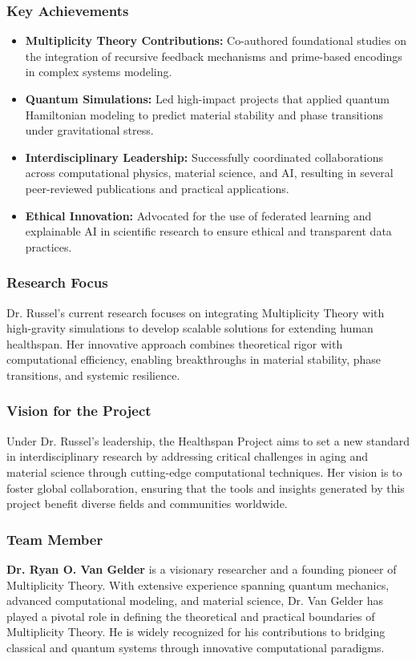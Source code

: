 \documentclass{article}
\theoremstyle{plain}
\begin{document}
\subsubsection*{Key Achievements}
\begin{itemize}
    \item \textbf{Multiplicity Theory Contributions:} Co-authored foundational studies on the integration of recursive feedback mechanisms and prime-based encodings in complex systems modeling.
    \item \textbf{Quantum Simulations:} Led high-impact projects that applied quantum Hamiltonian modeling to predict material stability and phase transitions under gravitational stress.
    \item \textbf{Interdisciplinary Leadership:} Successfully coordinated collaborations across computational physics, material science, and AI, resulting in several peer-reviewed publications and practical applications.
    \item \textbf{Ethical Innovation:} Advocated for the use of federated learning and explainable AI in scientific research to ensure ethical and transparent data practices.
\end{itemize}

\subsubsection*{Research Focus}
Dr. Russel’s current research focuses on integrating Multiplicity Theory with high-gravity simulations to develop scalable solutions for extending human healthspan. Her innovative approach combines theoretical rigor with computational efficiency, enabling breakthroughs in material stability, phase transitions, and systemic resilience.

\subsubsection*{Vision for the Project}
Under Dr. Russel’s leadership, the Healthspan Project aims to set a new standard in interdisciplinary research by addressing critical challenges in aging and material science through cutting-edge computational techniques. Her vision is to foster global collaboration, ensuring that the tools and insights generated by this project benefit diverse fields and communities worldwide.

\subsubsection*{Team Member}
\textbf{Dr. Ryan O. Van Gelder} is a visionary researcher and a founding pioneer of Multiplicity Theory. With extensive experience spanning quantum mechanics, advanced computational modeling, and material science, Dr. Van Gelder has played a pivotal role in defining the theoretical and practical boundaries of Multiplicity Theory. He is widely recognized for his contributions to bridging classical and quantum systems through innovative computational paradigms.
\end{document}
